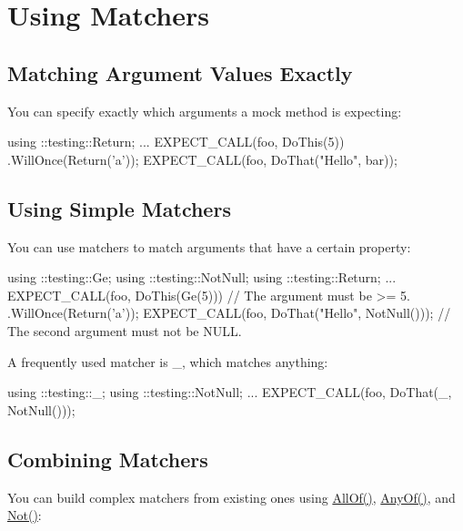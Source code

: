 \section*{Using Matchers}

\subsection*{Matching Argument Values Exactly}

You can specify exactly which arguments a mock method is expecting\+:


\begin{DoxyCode}
using ::testing::Return;
...
  EXPECT\_CALL(foo, DoThis(5))
      .WillOnce(Return('a'));
  EXPECT\_CALL(foo, DoThat("Hello", bar));
\end{DoxyCode}


\subsection*{Using Simple Matchers}

You can use matchers to match arguments that have a certain property\+:


\begin{DoxyCode}
using ::testing::Ge;
using ::testing::NotNull;
using ::testing::Return;
...
  EXPECT\_CALL(foo, DoThis(Ge(5)))  // The argument must be >= 5.
      .WillOnce(Return('a'));
  EXPECT\_CALL(foo, DoThat("Hello", NotNull()));
  // The second argument must not be NULL.
\end{DoxyCode}


A frequently used matcher is {\ttfamily \+\_\+}, which matches anything\+:


\begin{DoxyCode}
using ::testing::\_;
using ::testing::NotNull;
...
  EXPECT\_CALL(foo, DoThat(\_, NotNull()));
\end{DoxyCode}


\subsection*{Combining Matchers}

You can build complex matchers from existing ones using {\ttfamily \hyperlink{namespacetesting_af7618e8606c1cb45738163688944e2b7}{All\+Of()}}, {\ttfamily \hyperlink{namespacetesting_a81cfefd9f75cdce827d5bc873cf73aac}{Any\+Of()}}, and {\ttfamily \hyperlink{namespacetesting_a3d7d0dda7e51b13fe2f5aa28e23ed6b6}{Not()}}\+:


